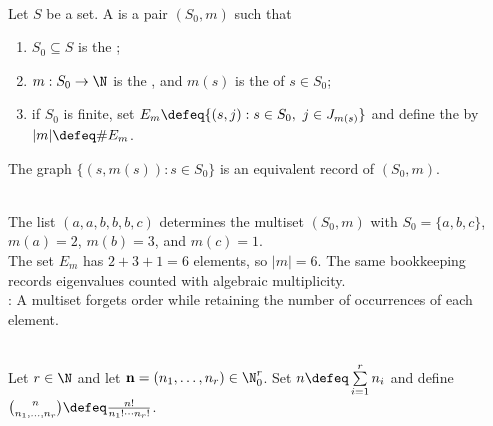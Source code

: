 \begin{definition} \label{def:multisets-and-multiplicity} \\
Let $S$ be a set. A  is a pair $(S_0,m)$ such that
\begin{enumerate}[label=(\roman*)]
\setlength{\itemsep}{0pt}
\item $S_0\subseteq S$ is the ;
\item $m:S_0\to\N$ is the , and $m(s)$ is the  of $s\in S_0$;
\item if $S_0$ is finite, set $E_m\defeq\{(s,j):s\in S_0,\ j\in J_{m(s)}\}$ and define the  by $\lvert m\rvert\defeq\#E_m$.
\end{enumerate}
The graph $\{(s,m(s)):s\in S_0\}$ is an equivalent record of $(S_0,m)$.
\end{definition}

\begin{example} \label{ex:multiset-eigenvalue-bookkeeping} \\
The list $(a,a,b,b,b,c)$ determines the multiset $(S_0,m)$ with $S_0=\{a,b,c\}$, $m(a)=2$, $m(b)=3$, and $m(c)=1$.\\
The set $E_m$ has $2+3+1=6$ elements, so $\lvert m\rvert=6$. The same bookkeeping records eigenvalues counted with algebraic multiplicity.\\
: A multiset forgets order while retaining the number of occurrences of each element.
\end{example}

\begin{definition} \label{def:multinomial-coefficients} \\
Let $r\in\N$ and let $\mathbf{n}=(n_1,\ldots,n_r)\in\N_0^r$. Set $n\defeq\sum\limits_{i=1}^{r}n_i$ and define $\binom{n}{n_1,\ldots,n_r}\defeq\frac{n!}{n_1!\cdots n_r!}$.
\end{definition}

